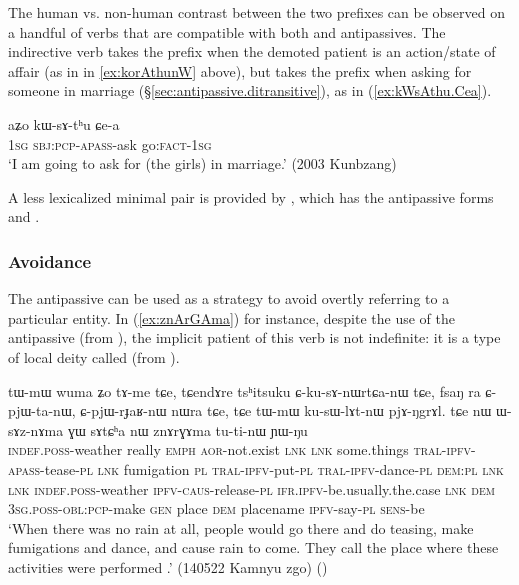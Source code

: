 The human vs. non-human contrast between the two prefixes can be observed on a handful of verbs that are compatible with both  and  antipassives. The indirective verb  takes the  prefix when the demoted patient is an action/state of affair (as in  in \ref{ex:korAthunW} above), but takes the  prefix when asking for someone in marriage (§\ref{sec:antipassive.ditransitive}), as in (\ref{ex:kWsAthu.Cea}).
 
\begin{exe}
\ex \label{ex:kWsAthu.Cea}
\gll  aʑo kɯ-sɤ-tʰu ɕe-a \\
\textsc{1sg} \textsc{sbj}:\textsc{pcp}-\textsc{apass}-ask go:\textsc{fact}-\textsc{1sg} \\
\glt `I am going to ask for (the girls) in marriage.' (2003 Kunbzang)
\end{exe}

A less lexicalized minimal pair is provided by , which has the antipassive forms  and .

\subsubsection{Avoidance} \label{sec:antipassive.avoidance}
The  antipassive can be used as a strategy to avoid overtly referring to a particular entity. In (\ref{ex:znArGAma}) for instance, despite the use of the antipassive  (from ), the implicit patient of this verb is not indefinite: it is a type of local deity called   (from ).

\begin{exe}
\ex \label{ex:znArGAma}
\gll tɯ-mɯ wuma ʑo tɤ-me tɕe, tɕendɤre tsʰitsuku ɕ-ku-sɤ-nɯrtɕa-nɯ tɕe, fsaŋ ra ɕ-pjɯ-ta-nɯ, ɕ-pjɯ-rɟaʁ-nɯ nɯra tɕe, tɕe tɯ-mɯ ku-sɯ-lɤt-nɯ pjɤ-ŋgrɤl. tɕe nɯ ɯ-sɤz-nɤma ɣɯ sɤtɕʰa nɯ znɤrɣɤma tu-ti-nɯ ɲɯ-ŋu \\
\textsc{indef}.\textsc{poss}-weather really \textsc{emph} \textsc{aor}-not.exist \textsc{lnk} \textsc{lnk} some.things \textsc{tral}-\textsc{ipfv}-\textsc{apass}-tease-\textsc{pl} \textsc{lnk} fumigation \textsc{pl} \textsc{tral}-\textsc{ipfv}-put-\textsc{pl} \textsc{tral}-\textsc{ipfv}-dance-\textsc{pl} \textsc{dem}:\textsc{pl} \textsc{lnk} \textsc{lnk} \textsc{indef}.\textsc{poss}-weather \textsc{ipfv}-\textsc{caus}-release-\textsc{pl} \textsc{ifr}.\textsc{ipfv}-be.usually.the.case \textsc{lnk} \textsc{dem} \textsc{3sg}.\textsc{poss}-\textsc{obl}:\textsc{pcp}-make \textsc{gen} place \textsc{dem} placename \textsc{ipfv}-say-\textsc{pl} \textsc{sens}-be \\
\glt `When there was no rain at all, people would go there and do teasing, make fumigations and dance, and cause rain to come. They call the place where these activities were performed .' (140522 Kamnyu zgo) 	()
\end{exe}

